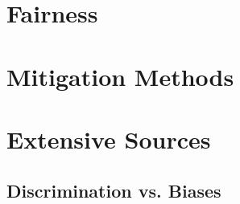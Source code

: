 \documentclass[12pt, a4paper, oneside]{book}   	%
\newif\ifrawcitationactive
\newcommand{\rawcitationstart}{\color{purple}\rawcitationactivetrue}
\begin{document}
			
		\section{Fairness}
			
			
			
		\section{Mitigation Methods}
			
			
			
		\section{Extensive Sources}
			
			\rawcitationstart
			\subsection{Discrimination vs. Biases}
\end{document}
